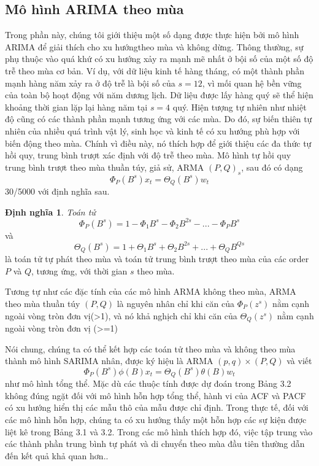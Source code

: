 \documentclass[12pt, a4paper,oneside]{book}
\theoremstyle{definition}
\newtheorem{dn}[theo]{Định nghĩa}
\begin{document}
\subsection{Mô hình ARIMA theo mùa}
		Trong phần này, chúng tôi giới thiệu một số dạng được thực hiện bởi mô hình ARIMA để giải thích cho xu hướngtheo mùa và không dừng. Thông thường, sự phụ thuộc vào quá khứ có xu hướng xảy ra mạnh mẽ nhất ở bội số của một số độ trễ theo mùa cơ bản. Ví dụ, với dữ liệu kinh tế hàng tháng, có một thành phần mạnh hàng năm xảy ra ở độ trễ là bội số của $s = 12$, vì mối quan hệ bền vững của toàn bộ hoạt động với năm dương lịch. Dữ liệu được lấy hàng quý sẽ thể hiện khoảng thời gian lặp lại hàng năm tại $s = 4$ quý. Hiện tượng tự nhiên như nhiệt độ cũng có các thành phần mạnh tương ứng với các mùa. Do đó, sự biến thiên tự nhiên của nhiều quá trình vật lý, sinh học và kinh tế có xu hướng phù hợp với biến động theo mùa. Chính vì điều này, nó thích hợp để giới thiệu các đa thức tự hồi quy, trung bình trượt xác định với độ trễ theo mùa. Mô hình tự hồi quy trung bình trượt theo mùa thuần túy, giả sử, ARMA $(P,Q)_{s}$, sau đó có dạng
$$\Phi_{P} (B^{s})x_{t}=\varTheta_{Q}(B^{s})w_{t}$$
30/5000
với định nghĩa sau.

\begin{dn}	
	\textit{Toán tử} 	$$ \Phi_ {P} (B^{s}) = 1-\Phi_{1}  B^{s} -\Phi_{2}  B^{2s}-...- \Phi_{P}  B^{s}$$
	và
	$$\varTheta_{Q}(B^{s})= 1+ \varTheta_{1}B^{s} + \varTheta_{2}B^{2s}+...+ \varTheta_{Q}B^{Qs}$$
	là toán tử tự phát theo mùa và toán tử trung bình trượt theo mùa của các order $P$ và $Q$, tương ứng, với thời gian $s$ theo mùa.
\end{dn}
Tương tự như các đặc tính của các mô hình ARMA không theo mùa, ARMA theo mùa thuần túy $(P, Q)$ là nguyên nhân chỉ khi căn của $\Phi_ {P} (z^{s})$ nằm cạnh ngoài vòng tròn đơn vị(>1), và nó khả nghịch chỉ khi căn của $\varTheta_{Q}(z^{s})$ nằm cạnh ngoài vòng tròn đơn vị (>=1)

Nói chung, chúng ta có thể kết hợp các toán tử theo mùa và không theo mùa thành mô hình SARIMA nhân, được ký hiệu là ARMA $(p, q)\times (P, Q)$ và viết
$$\Phi_ {P} (B^{s})\phi(B)x_{t}= \varTheta_{Q}(B^{s})\theta(B)w_{t}$$
như mô hình tổng thể. Mặc dù các thuộc tính được dự đoán trong Bảng 3.2 không đúng ngặt đối với mô hình hỗn hợp tổng thể, hành vi của ACF và PACF có xu hướng hiển thị các mẫu thô của mẫu được chỉ định. Trong thực tế, đối với các mô hình hỗn hợp, chúng ta có xu hướng thấy một hỗn hợp các sự kiện được liệt kê trong Bảng 3.1 và 3.2. Trong các mô hình thích hợp đó, việc tập trung vào các thành phần trung bình tự phát và di chuyển theo mùa đầu tiên thường dẫn đến kết quả khả quan hơn..
\end{document}
